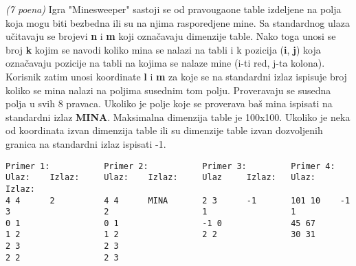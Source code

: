 \begin{Exercise}[label=v1.3_01] 
{\em (7 poena)} Igra "Minesweeper" sastoji se od pravougaone table
   izdeljene na polja koja mogu biti bezbedna ili su na njima
   rasporedjene mine. Sa standardnog ulaza učitavaju se
   brojevi \textbf{n} i \textbf{m} koji označavaju dimenzije
   table. Nako toga unosi se broj \textbf{k} kojim se navodi koliko
   mina se nalazi na tabli i k pozicija (\textbf{i}, \textbf{j}) koja
   označavaju pozicije na tabli na kojima se nalaze mine (i-ti red,
   j-ta kolona). Korisnik zatim unosi koordinate \textbf{l}
   i \textbf{m} za koje se na standardni izlaz ispisuje broj koliko se
   mina nalazi na poljima susednim tom polju. Proveravaju se susedna
   polja u svih 8 pravaca.  Ukoliko je polje koje se proverava baš
   mina ispisati na standardni izlaz \textbf{MINA}. Maksimalna
   dimenzija table je 100x100. Ukoliko je neka od koordinata izvan
   dimenzija table ili su dimenzije table izvan dozvoljenih granica na
   standardni izlaz ispisati -1.


\begin{center}
\begin{verbatim}
Primer 1:           Primer 2:           Primer 3:         Primer 4:
Ulaz:    Izlaz:     Ulaz:    Izlaz:     Ulaz     Izlaz:   Ulaz:     Izlaz:
4 4      2          4 4      MINA       2 3      -1       101 10    -1
3                   2                   1                 1
0 1                 0 1                 -1 0              45 67
1 2                 1 2                 2 2               30 31
2 3                 2 3
2 2                 2 3
\end{verbatim}
\end{center}
\end{Exercise}
\begin{Answer}[ref=v1.3_01]
\end{Answer}


